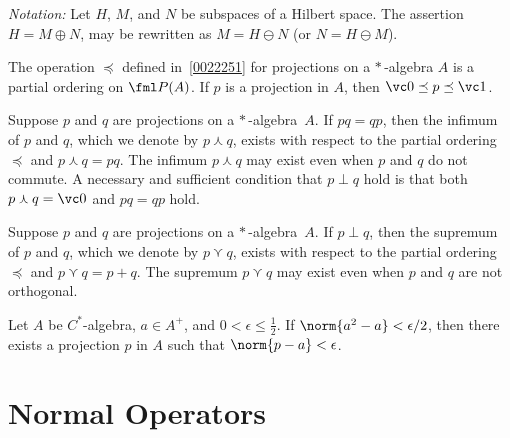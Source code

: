 \noindent\emph{Notation:} Let $H$, $M$, and $N$ be subspaces of a Hilbert space. The assertion
$H = M \oplus N$, may be rewritten as $M = H \ominus N$ (or $N = H \ominus M$).

\begin{prop} The operation $\preceq$ defined in~\ref{0022251} for projections on a
$*\,$-algebra $A$ is a partial ordering on $\fml P(A)$.  If $p$ is a projection in $A$,
then $\vc 0 \preceq p \preceq \vc 1$.
\end{prop}

\begin{prop} Suppose $p$ and $q$ are projections on a $*\,$-algebra~$A$. If $pq = qp$, then
the infimum of $p$ and $q$, which we denote
by $p \curlywedge q$, exists with respect to the partial ordering $\preceq$ and $p
\curlywedge q = pq$.  The infimum $p \curlywedge q$ may exist even when $p$ and $q$ do
not commute.  A necessary and sufficient condition that $p \perp q$ hold is that both $p
\curlywedge q = \vc 0$ and $pq = qp$ hold.
\end{prop}

\begin{prop} Suppose $p$ and $q$ are projections on a $*\,$-algebra~$A$. If $p \perp q$, then
the supremum of $p$ and $q$, which we denote
by $p \curlyvee q$, exists with respect to the partial ordering $\preceq$ and $p
\curlyvee q = p + q$.  The supremum $p \curlyvee q$ may exist even when $p$ and $q$ are
not orthogonal.
\end{prop}

\begin{prop} Let $A$ be $C^*$-algebra, $a \in A^+$, and $0 < \epsilon \le \frac12$.  If
$\norm{a^2 - a} < \epsilon/2$, then there exists a projection $p$ in $A$ such that
$\norm{p - a} < \epsilon$.
\end{prop}











\section{Normal Operators}


